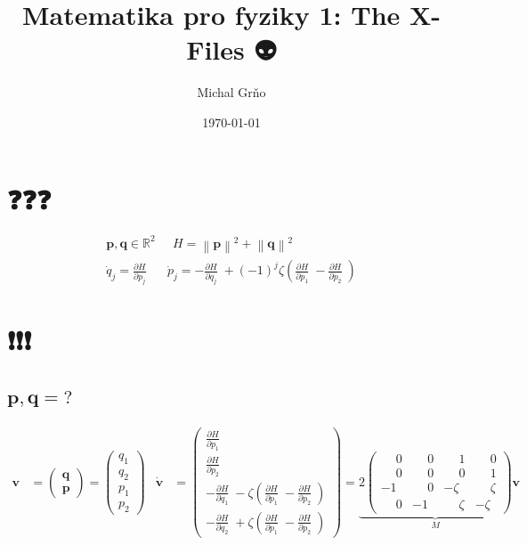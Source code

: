 \documentclass[10pt,a4paper]{article}
\def\ph{\phantom}
\newcommand{\norm}[1]{\left\lVert#1\right\rVert}
\newcommand{\mat}[1]{
    \begin{pmatrix}
        #1
    \end{pmatrix}
}
\newcommand{\pd}[2]{\frac{\partial  #1}{\partial  #2} \;}
\begin{document}
\title{Matematika pro fyziky 1: The X-Files 👽️}
\author{Michal Grňo}
\date{\today}

\maketitle

\section{❓️❓️❓️}

\begin{gather*}
    \bm{p}, \bm{q} \in \mathbb{R}^2
    \;\;\;\;\;
    H = \norm{\bm{p}}^2 + \norm{\bm{q}}^2
    \\[10pt]
    \dot{q}_j = \pd{H}{p_j}
    \;\;\;\;\;
    \dot{p}_j = -\pd{H}{q_j} + (-1)^j \zeta \left( \pd{H}{p_1} - \pd{H}{p_2} \right)
\end{gather*}

\section{❗️❗️❗️}

\subsection{
    \texorpdfstring{
        $\pmb{ p,q = \mathit{?} }$
    }{
        p,q = ?
    }
}

\begin{align*}
    \bm{v} &= \mat{ \bm{q} \\ \bm{p} } = \mat{ q_1 \\ q_2 \\ p_1 \\ p_2}
    &
    \dot{\bm{v}} &= \mat{
        \pd{H}{p_1} \\ \pd{H}{p_2} \\
        -\pd{H}{q_1} - \zeta \left( \pd{H}{p_1} - \pd{H}{p_2} \right) \\
        -\pd{H}{q_2} + \zeta \left( \pd{H}{p_1} - \pd{H}{p_2} \right)
    }
    =
    \underbrace{
        2
        \mat{
            \ph{-}0 & \ph{-}0 & \ph{-}1 & \ph{-}0 \\
            \ph{-}0 & \ph{-}0 & \ph{-}0 & \ph{-}1 \\
            -1      & \ph{-}0 & -\zeta  & \ph{-}\zeta \\
            \ph{-}0 & -1      & \ph{-}\zeta & -\zeta
        }
    }_M \bm{v}
\end{align*}
\end{document}

